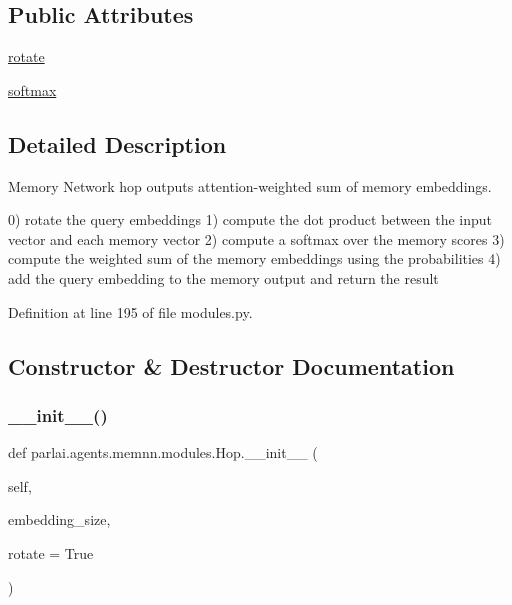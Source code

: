\subsection*{Public Attributes}
\begin{DoxyCompactItemize}
\item 
\hyperlink{classparlai_1_1agents_1_1memnn_1_1modules_1_1Hop_a88857c10815bc48ef24c78ecf367935d}{rotate}
\item 
\hyperlink{classparlai_1_1agents_1_1memnn_1_1modules_1_1Hop_a50d4a5a4bd188efc2944d68c0761cc0a}{softmax}
\end{DoxyCompactItemize}


\subsection{Detailed Description}
\begin{DoxyVerb}Memory Network hop outputs attention-weighted sum of memory embeddings.

0) rotate the query embeddings
1) compute the dot product between the input vector and each memory vector
2) compute a softmax over the memory scores
3) compute the weighted sum of the memory embeddings using the probabilities
4) add the query embedding to the memory output and return the result
\end{DoxyVerb}
 

Definition at line 195 of file modules.\+py.



\subsection{Constructor \& Destructor Documentation}
\mbox{\label{classparlai_1_1agents_1_1memnn_1_1modules_1_1Hop_aa38fc63425e2968ae2530edd6b37ad1a}} 
\subsubsection{\texorpdfstring{\+\_\+\+\_\+init\+\_\+\+\_\+()}{\_\_init\_\_()}}
{\footnotesize\ttfamily def parlai.\+agents.\+memnn.\+modules.\+Hop.\+\_\+\+\_\+init\+\_\+\+\_\+ (\begin{DoxyParamCaption}\item[{}]{self,  }\item[{}]{embedding\+\_\+size,  }\item[{}]{rotate = {\ttfamily True} }\end{DoxyParamCaption})}

